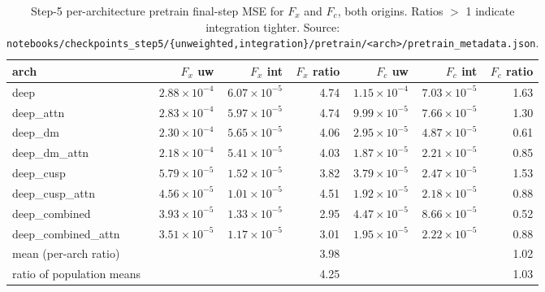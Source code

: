 \documentclass[11pt,letterpaper]{article}
\begin{document}
\begin{table}[h]
\centering
\caption{Step-5 per-architecture pretrain final-step MSE for $F_x$ and
$F_c$, both origins. Ratios $>$ 1 indicate integration tighter.
Source: \texttt{notebooks/checkpoints\_step5/\{unweighted,integration\}/pretrain/<arch>/pretrain\_metadata.json}.}
\label{S:tab:pretrain_per_arch}
\small
\begin{tabular}{lrrrrrr}
\toprule
arch & $F_x$ uw & $F_x$ int & $F_x$ ratio & $F_c$ uw & $F_c$ int & $F_c$ ratio \\
\midrule
deep                & $2.88\!\times\!10^{-4}$ & $6.07\!\times\!10^{-5}$ & 4.74 & $1.15\!\times\!10^{-4}$ & $7.03\!\times\!10^{-5}$ & 1.63 \\
deep\_attn          & $2.83\!\times\!10^{-4}$ & $5.97\!\times\!10^{-5}$ & 4.74 & $9.99\!\times\!10^{-5}$ & $7.66\!\times\!10^{-5}$ & 1.30 \\
deep\_dm            & $2.30\!\times\!10^{-4}$ & $5.65\!\times\!10^{-5}$ & 4.06 & $2.95\!\times\!10^{-5}$ & $4.87\!\times\!10^{-5}$ & 0.61 \\
deep\_dm\_attn      & $2.18\!\times\!10^{-4}$ & $5.41\!\times\!10^{-5}$ & 4.03 & $1.87\!\times\!10^{-5}$ & $2.21\!\times\!10^{-5}$ & 0.85 \\
deep\_cusp          & $5.79\!\times\!10^{-5}$ & $1.52\!\times\!10^{-5}$ & 3.82 & $3.79\!\times\!10^{-5}$ & $2.47\!\times\!10^{-5}$ & 1.53 \\
deep\_cusp\_attn    & $4.56\!\times\!10^{-5}$ & $1.01\!\times\!10^{-5}$ & 4.51 & $1.92\!\times\!10^{-5}$ & $2.18\!\times\!10^{-5}$ & 0.88 \\
deep\_combined      & $3.93\!\times\!10^{-5}$ & $1.33\!\times\!10^{-5}$ & 2.95 & $4.47\!\times\!10^{-5}$ & $8.66\!\times\!10^{-5}$ & 0.52 \\
deep\_combined\_attn& $3.51\!\times\!10^{-5}$ & $1.17\!\times\!10^{-5}$ & 3.01 & $1.95\!\times\!10^{-5}$ & $2.22\!\times\!10^{-5}$ & 0.88 \\
\midrule
mean (per-arch ratio) & & & 3.98 & & & 1.02 \\
ratio of population means & & & 4.25 & & & 1.03 \\
\bottomrule
\end{tabular}
\end{table}
\end{document}
